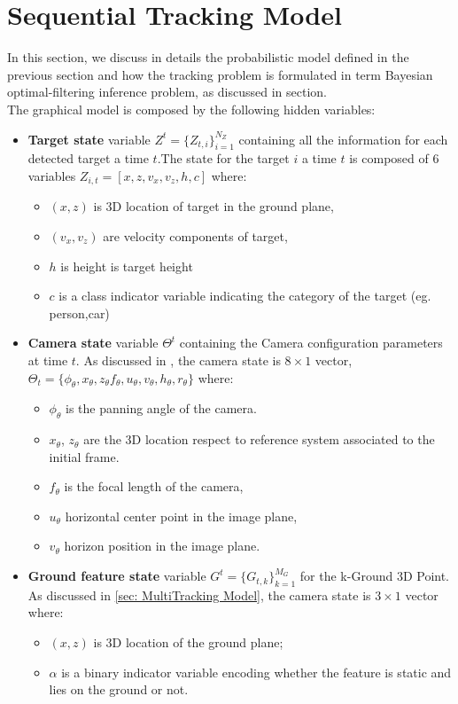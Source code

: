 \section{Sequential Tracking Model}
In this section, we discuss in details the probabilistic model defined in the previous section and how the tracking problem is formulated in term Bayesian optimal-filtering inference problem, as discussed in section.\\
The graphical model is composed by the following hidden variables:
\begin{itemize}
\item \textbf{Target state} variable $Z^t = \{Z_{t,i} \}_{i=1}^{N_Z}$ containing all the information for each detected target a time $t$.The state for the target $i$ a time $t$ is composed of 6 variables $Z_ {i,t}=[ x,z,v_x,v_z,h,c]$ where:
\begin{itemize}
\item $(x, z)$ is 3D location of target in the ground plane,
\item $(v_x , v_z )$ are velocity components of target,
\item $h$ is height is target height
\item $c$ is a class indicator variable indicating the category of the target (eg. person,car)
\end{itemize}

\item \textbf{Camera state} variable $\Theta^{t}$ containing the Camera configuration parameters at time $t$. As discussed in \label{sec: Multi-Tracking Model}, the camera state is $8\times1$ vector, $\Theta_{t}=\{\phi_{\theta}, x_{\theta}, z_{\theta} f_{\theta}, u_{\theta}, v_{\theta}, h_{\theta},r_{\theta} \}$ where:
\begin{itemize}
\item $\phi_{\theta}$ is the panning angle of the camera.
\item $x_{\theta}$, $z_{\theta}$ are the 3D location respect to reference system associated to the initial frame.
\item $f_{\theta}$ is the focal length of the camera,
\item $u_{\theta}$ horizontal center point in the image plane,
\item $v_{\theta}$ horizon position  in the image plane.
\end{itemize}

\item \textbf{Ground feature state} variable $G^{t} =\{G_{t,k} \}_{k=1}^{M_G}$ for the k-Ground 3D Point. As  discussed in \ref{sec: MultiTracking Model}, the camera state is $3\times1$ vector where:
 \begin{itemize}
\item $(x, z)$ is 3D location of the ground plane;
\item $\alpha$ is a binary indicator variable encoding whether the feature is static and lies on the ground or not.
\end{itemize}
\end{itemize}
